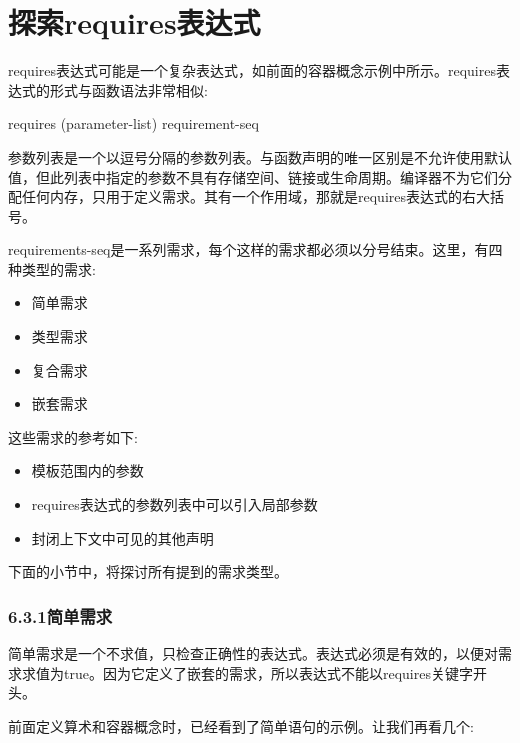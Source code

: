 \section{探索requires表达式}

requires表达式可能是一个复杂表达式，如前面的容器概念示例中所示。requires表达式的形式与函数语法非常相似:

\begin{cpp}
requires (parameter-list) { requirement-seq }
\end{cpp}

参数列表是一个以逗号分隔的参数列表。与函数声明的唯一区别是不允许使用默认值，但此列表中指定的参数不具有存储空间、链接或生命周期。编译器不为它们分配任何内存，只用于定义需求。其有一个作用域，那就是requires表达式的右大括号。

requirements-seq是一系列需求，每个这样的需求都必须以分号结束。这里，有四种类型的需求:

\begin{itemize}
\item
简单需求

\item
类型需求

\item
复合需求

\item
嵌套需求
\end{itemize}

这些需求的参考如下:

\begin{itemize}
\item
模板范围内的参数

\item
requires表达式的参数列表中可以引入局部参数

\item
封闭上下文中可见的其他声明
\end{itemize}

下面的小节中，将探讨所有提到的需求类型。

\subsubsection{6.3.1\hspace{0.2cm}简单需求}

简单需求是一个不求值，只检查正确性的表达式。表达式必须是有效的，以便对需求求值为true。因为它定义了嵌套的需求，所以表达式不能以requires关键字开头。

前面定义算术和容器概念时，已经看到了简单语句的示例。让我们再看几个:

